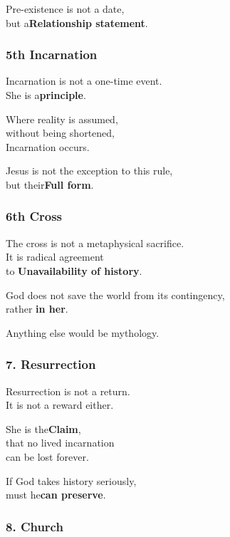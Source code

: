 \documentclass[
]{article}
\begin{document}
Pre-existence is not a date,\\
but a\textbf{Relationship statement}.

\subsubsection{\texorpdfstring{\textbf{5th Incarnation}}{5th Incarnation}}\label{th-incarnation}

Incarnation is not a one-time event.\\
She is a\textbf{principle}.

Where reality is assumed,\\
without being shortened,\\
Incarnation occurs.

Jesus is not the exception to this rule,\\
but their\textbf{Full form}.

\subsubsection{\texorpdfstring{\textbf{6th Cross}}{6th Cross}}\label{th-cross}

The cross is not a metaphysical sacrifice.\\
It is radical agreement\\
to \textbf{Unavailability of history}.

God does not save the world from its contingency,\\
rather \textbf{in her}.

Anything else would be mythology.

\subsubsection{\texorpdfstring{\textbf{7. Resurrection}}{7. Resurrection}}\label{resurrection}

Resurrection is not a return.\\
It is not a reward either.

She is the\textbf{Claim},\\
that no lived incarnation\\
can be lost forever.

If God takes history seriously,\\
must he\textbf{can preserve}.

\subsubsection{\texorpdfstring{\textbf{8. Church}}{8. Church}}\label{church}
\end{document}
